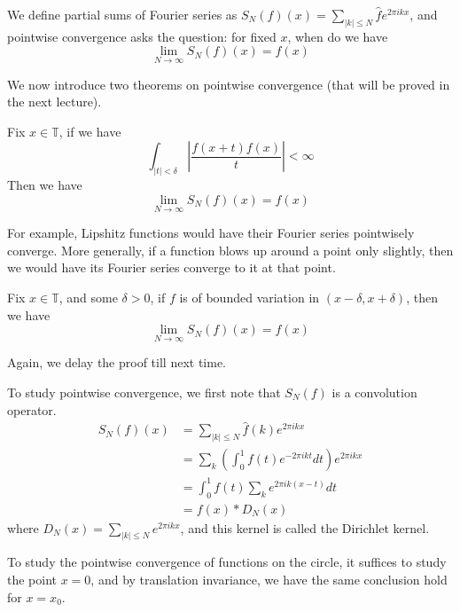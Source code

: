 We define partial sums of Fourier series as $S_N(f)(x)=\sum_{|k|\leq N}\hat{f}e^{2\pi ikx}$, and pointwise convergence asks the question: for fixed $x$, when do we have
\begin{equation*}
    \lim_{N\to\infty}S_N(f)(x)=f(x)
\end{equation*}

We now introduce two theorems on pointwise convergence (that will be proved in the next lecture).
\begin{theorem}
    Fix $x\in\mathbb{T}$, if we have
    \begin{equation*}
        \int_{|t|<\delta}\left|\frac{f(x+t)f(x)}{t} \right|<\infty
    \end{equation*}
    Then we have
    \begin{equation*}
        \lim_{N\to\infty}S_N(f)(x)=f(x)
    \end{equation*}
\end{theorem}

For example, Lipshitz functions would have their Fourier series pointwisely converge. More generally, if a function blows up around a point only slightly, then we would have its Fourier series converge to it at that point.

\begin{theorem}
    Fix $x\in\mathbb{T}$, and some $\delta>0$, if $f$ is of bounded variation in $(x-\delta, x+\delta)$, then we have
    \begin{equation*}
        \lim_{N\to\infty}S_N(f)(x)=f(x)
    \end{equation*}
\end{theorem}

Again, we delay the proof till next time.

To study pointwise convergence, we first note that $S_N(f)$ is a convolution operator.
\begin{align*}
    S_N(f)(x)&=\sum_{|k|\leq N}\hat{f}(k)e^{2\pi ikx}\\
    &=\sum_k\left(\int_0^1f(t)e^{-2\pi ikt}dt \right)e^{2\pi ikx}\\
    &=\int_0^1f(t)\sum_ke^{2\pi ik(x-t)}dt\\
    &=f(x)\ast D_N(x)
\end{align*}
where $D_N(x)=\sum_{|k|\leq N}e^{2\pi ikx}$, and this kernel is called the Dirichlet kernel.

\begin{remark}
    To study the pointwise convergence of functions on the circle, it suffices to study the point $x=0$, and by translation invariance, we have the same conclusion hold for $x=x_0$.
\end{remark}

